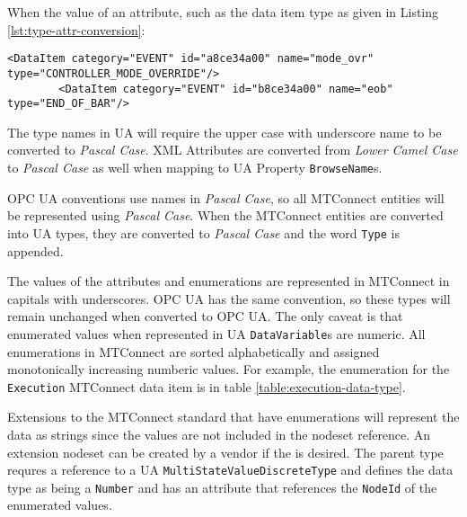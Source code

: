 When the value of an attribute, such as the data item type as given in Listing \ref{lst:type-attr-conversion}:

\begin{lstlisting}[firstnumber=1,%
    caption={\texttt{DataItem} \texttt{type} Attribtue Conversion}, label={lst:type-attr-conversion}]
        <DataItem category="EVENT" id="a8ce34a00" name="mode_ovr" type="CONTROLLER_MODE_OVERRIDE"/>
        <DataItem category="EVENT" id="b8ce34a00" name="eob" type="END_OF_BAR"/>
\end{lstlisting}

The type names in UA will require the upper case with underscore name to be converted to \textit{Pascal Case}. XML Attributes are converted from \textit{Lower Camel Case} to \textit{Pascal Case} as well when mapping to UA Property \texttt{BrowseName}s.

OPC UA conventions use names in \textit{Pascal Case}, so all MTConnect entities will be represented using \textit{Pascal Case}. When the MTConnect entities are converted into UA types, they are converted to \textit{Pascal Case} and the word \texttt{Type} is appended. 

The values of the attributes and enumerations are represented in MTConnect in capitals with underscores. OPC UA has the same convention, so these types will remain unchanged when converted to OPC UA. The only caveat is that enumerated values when represented in UA \texttt{DataVariable}s are numeric. All enumerations in MTConnect are sorted alphabetically and assigned monotonically increasing numberic values. For example, the enumeration for the \texttt{Execution} MTConnect data item is in table \ref{table:execution-data-type}.

Extensions to the MTConnect standard that have enumerations will represent the data as strings since the values are not included in the nodeset reference. An extension nodeset can be created by a vendor if the  is desired. The parent type requres a reference to a UA \texttt{MultiState\-Value\-Discrete\-Type} and defines the data type as being a \texttt{Number} and has an attribute that references the \texttt{NodeId} of the enumerated values.

